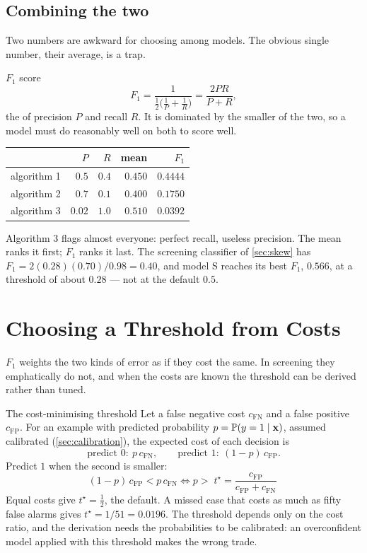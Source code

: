 \subsection{Combining the two}

Two numbers are awkward for choosing among models. The obvious single number,
their average, is a trap.

\begin{defbox}{$F_1$ score}
\[
  F_1 = \frac{1}{\tfrac12\bigl(\tfrac1P + \tfrac1R\bigr)} = \frac{2PR}{P + R},
\]
the  of precision $P$ and recall $R$. It is dominated by the
smaller of the two, so a model must do reasonably well on both to score well.
\end{defbox}

\begin{center}
\small
\renewcommand{\arraystretch}{1.15}
\begin{tabular}{@{}lrrrr@{}}
\toprule
 & $P$ & $R$ & mean & $F_1$\\
\midrule
algorithm 1 & $0.5$  & $0.4$ & $0.450$ & $\mathbf{0.4444}$\\
algorithm 2 & $0.7$  & $0.1$ & $0.400$ & $0.1750$\\
algorithm 3 & $0.02$ & $1.0$ & $\mathbf{0.510}$ & $0.0392$\\
\bottomrule
\end{tabular}
\end{center}

Algorithm 3 flags almost everyone: perfect recall, useless precision. The mean
ranks it first; $F_1$ ranks it last. The screening classifier of
\cref{sec:skew} has $F_1 = 2(0.28)(0.70)/0.98 = 0.40$, and model S reaches its
best $F_1$, $0.566$, at a threshold of about $0.28$ --- not at the default $0.5$.

\section{Choosing a Threshold from Costs}
\label{sec:threshold-costs}

$F_1$ weights the two kinds of error as if they cost the same. In screening they
emphatically do not, and when the costs are known the threshold can be derived
rather than tuned.

\begin{derivation}{The cost-minimising threshold}
Let a false negative cost $c_{\text{FN}}$ and a false positive $c_{\text{FP}}$.
For an example with predicted probability $p = \mathbb{P}(y = 1\mid\mathbf{x})$, assumed
calibrated (\cref{sec:calibration}), the expected cost of each decision is
\[
  \text{predict } 0:\ p\,c_{\text{FN}}, \qquad
  \text{predict } 1:\ (1-p)\,c_{\text{FP}} .
\]
Predict $1$ when the second is smaller:
\[
  (1-p)\,c_{\text{FP}} < p\,c_{\text{FN}}
  \iff
  p > \boxed{\;t^\star = \frac{c_{\text{FP}}}{c_{\text{FP}} + c_{\text{FN}}}\;}
\]
Equal costs give $t^\star = \tfrac12$, the default. A missed case that costs as
much as fifty false alarms gives $t^\star = 1/51 = 0.0196$. The threshold
depends only on the cost ratio, and the derivation needs the probabilities to be
calibrated: an overconfident model applied with this threshold makes the wrong
trade.
\end{derivation}

